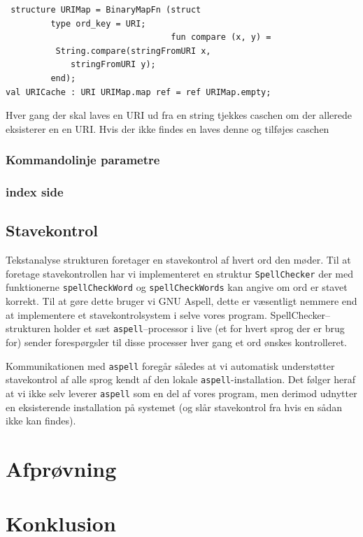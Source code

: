 \documentclass[a4paper,oneside,article]{memoir}
\begin{document}
\begin{verbatim}
 structure URIMap = BinaryMapFn (struct 
         type ord_key = URI; 
                                 fun compare (x, y) = 
          String.compare(stringFromURI x, 
             stringFromURI y);
         end);
val URICache : URI URIMap.map ref = ref URIMap.empty;
\end{verbatim}

Hver gang der skal laves en URI ud fra en string tjekkes caschen om
der allerede eksisterer en en URI. Hvis der ikke findes en laves denne
og tilføjes caschen

\subsection{Kommandolinje parametre}

\subsection{index side}

\section{Stavekontrol}
Tekstanalyse strukturen foretager en stavekontrol af hvert ord den
møder. Til at foretage stavekontrollen har vi implementeret en
struktur \texttt{SpellChecker} der med funktionerne
\texttt{spellCheckWord} og \texttt{spellCheckWords} kan angive om ord
er stavet korrekt. Til at gøre dette bruger vi GNU Aspell, dette er
væsentligt nemmere end at implementere et stavekontrolsystem i selve
vores program. SpellChecker--strukturen holder et sæt
\texttt{aspell}--processor i live (et for hvert sprog der er brug for)
sender forespørgsler til disse processer hver gang et ord ønskes
kontrolleret.

Kommunikationen med \texttt{aspell} foregår således at
vi automatisk understøtter stavekontrol af alle sprog kendt af den
lokale \texttt{aspell}-installation. Det følger heraf at vi ikke selv
leverer \texttt{aspell} som en del af vores program, men derimod
udnytter en eksisterende installation på systemet (og slår
stavekontrol fra hvis en sådan ikke kan findes).


\chapter{Afprøvning}


\chapter{Konklusion}
\end{document}
